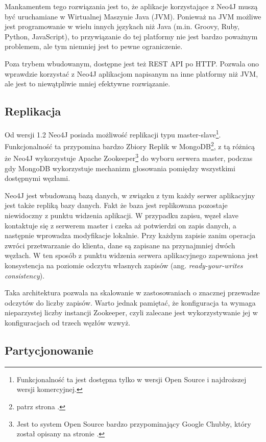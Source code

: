 Mankamentem tego rozwiązania jest to, że aplikacje korzystające z Neo4J muszą być uruchamiane w Wirtualnej Maszynie Java (JVM).
Ponieważ na JVM możliwe jest programowanie w wielu innych językach niż Java (m.in. Groovy, Ruby, Python, JavaScript), to przywiązanie do tej platformy nie jest bardzo poważnym problemem, ale tym niemniej jest to pewne ograniczenie.

Poza trybem wbudowanym, dostępne jest też REST API po HTTP.
Pozwala ono wprawdzie korzystać z Neo4J aplikacjom napisanym na inne platformy niż JVM, ale jest to niewątpliwie mniej efektywne rozwiązanie.

\subsection*{Replikacja}


Od wersji 1.2 Neo4J posiada możliwość replikacji typu master-slave\footnote{Funkcjonalność ta jest dostępna tylko w wersji Open Source i najdroższej wersji komercyjnej.}.
Funkcjonalność ta przypomina bardzo Zbiory Replik w MongoDB\footnote{patrz strona \pageref{sec:mongodb-replication}.}, z tą różnicą że Neo4J wykorzystuje Apache Zookeeper\footnote{Jest to system Open Source bardzo przypominający Google Chubby, który został opisany na stronie \pageref{sec:google-chubby}.} do wyboru serwera master, podczas gdy MongoDB wykorzystuje mechanizm głosowania pomiędzy wszystkimi dostępnymi węzłami.

Neo4J jest wbudowaną bazą danych, w związku z tym każdy serwer aplikacyjny jest także repliką bazy danych.
Fakt że baza jest replikowana pozostaje niewidoczny z punktu widzenia aplikacji.
W przypadku zapisu, węzeł slave kontaktuje się z serwerem master i czeka aż potwierdzi on zapis danych, a następnie wprowadza modyfikacje lokalnie.
Przy każdym zapisie zanim operacja zwróci przetwarzanie do klienta, dane są zapisane na przynajmniej dwóch węzłach.
W ten sposób z punktu widzenia serwera aplikacyjnego zapewniona jest konsystencja na poziomie odczytu własnych zapisów (ang. \emph{ready-your-writes consistency}).

Taka architektura pozwala na skalowanie w zastosowaniach o znacznej przewadze odczytów do liczby zapisów.
Warto jednak pamiętać, że konfiguracja ta wymaga nieparzystej liczby instancji Zookeeper, czyli zalecane jest wykorzystywanie jej w konfiguracjach od trzech węzłów wzwyż.

\subsection*{Partycjonowanie}


